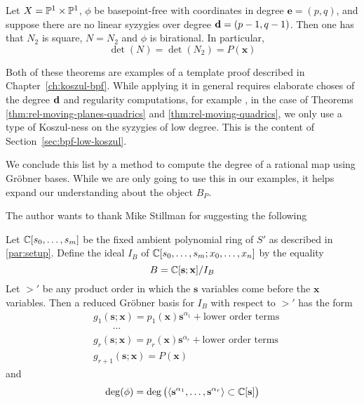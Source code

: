 \documentclass[fleqn,reqno]{amsart}
\numberwithin{first}{chapter}
\begin{document}
\begin{theorem}
\label{thm:rel-moving-quadrics}
Let $X=\mathbb{P}^1\times\mathbb{P}^1$, $\phi$ be basepoint-free with coordinates in degree $\mathbf e=(p,q)$,
and suppose there are no linear syzygies over degree $\mathbf d=(p-1,q-1)$.
Then one has that $N_2$ is square, $N=N_2$ and $\phi$ is birational. In particular,
\[
	\det(N)=\det(N_2)=P(\mathbf x)
\]
\end{theorem}

\begin{paragraf*}
Both of these theorems are examples of a template proof described in Chapter~\ref{ch:koszul-bpf}.
While applying it in general requires elaborate choses of the degree $\mathbf d$ and
regularity computations, for example \citet{AHW-05},
in the case of Theorems \ref{thm:rel-moving-planes-quadrics} and \ref{thm:rel-moving-quadrics},
we only use a type of Koszul-ness on the syzygies of low degree.
This is the content of Section~\ref{sec:bpf-low-koszul}.
\end{paragraf*}



\begin{paragraf*}
We conclude this list by a method to compute the degree of a rational map using Gr\"{o}bner bases.
While we are only going to use this in our examples,
it helps expand our understanding about the object $B_P$.

The author wants to thank Mike Stillman for suggesting the following
\end{paragraf*}

\begin{proposition}
\label{prop:deg-GB}
Let $\mathbb{C}[s_0,\ldots,s_m]$ be the fixed ambient polynomial ring of $S'$ as described in
\eqref{par:setup}.
Define the ideal $I_B$ of $\mathbb{C}[s_0,\ldots,s_m;x_0,\ldots,x_n]$ by the equality
\[
	B=\mathbb{C}[\mathbf s;\mathbf x]/I_B
\]
Let $>'$ be any product order in which the $\mathbf s$ variables
come before the $\mathbf x$ variables.
Then a reduced Gr\"obner basis for $I_B$ with respect to $>'$ has the form
\begin{align*}
	&g_1(\mathbf s;\mathbf x)=p_1(\mathbf x){\mathbf s}^{\alpha_1}+\text{lower order terms}\\
	&\qquad\cdots\\
	&g_r(\mathbf s;\mathbf x)=p_r(\mathbf x){\mathbf s}^{\alpha_r}+\text{lower order terms}\\
	&g_{r+1}(\mathbf s;\mathbf x)=P(\mathbf x)
\end{align*}
and
\[
	\deg(\phi)=
	\deg \big(\langle{\mathbf s}^{\alpha_1},\ldots,{\mathbf s}^{\alpha_r}\rangle\subset\mathbb{C}[\mathbf s]\big)
\]
\end{proposition}
\end{document}
